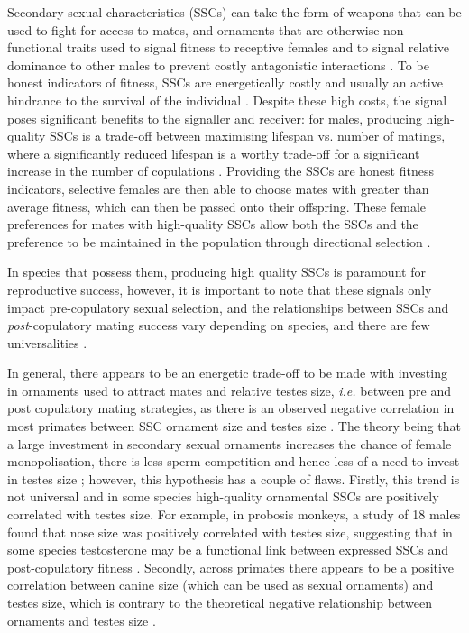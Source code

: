 Secondary sexual characteristics (SSCs)  can take the form of weapons that can be used to fight for access to mates, and ornaments that are otherwise non-functional traits used to signal fitness to receptive females and to signal relative dominance to other males to prevent costly antagonistic interactions \citep{Kappeler.2004}. To be honest indicators of fitness, SSCs are energetically costly and usually an active hindrance to the survival of the individual \citep{Zahavi.1975}. Despite these high costs, the signal poses significant benefits to the signaller and receiver: for males, producing high-quality SSCs is a trade-off between maximising lifespan vs. number of matings, where a significantly reduced lifespan is a worthy trade-off for a significant increase in the number of copulations \citep{Petersen.2020b6j}. Providing the SSCs are honest fitness indicators, selective females are then able to choose mates with greater than average fitness, which can then be passed onto their offspring. These female preferences for mates with high-quality SSCs allow both the SSCs and the preference to be maintained in the population through directional selection \citep{Gomulkiewicz.1991}. 

In species that possess them, producing high quality SSCs is paramount for reproductive success, however, it is important to note that these signals only impact pre-copulatory sexual selection, and the relationships between SSCs and \textit{post}-copulatory mating success vary depending on species, and there are few universalities \citep{Setchell.2003}.  

In general, there appears to be an energetic trade-off to be made with investing in ornaments used to attract mates and relative testes size, \textit{i.e.} between pre and post copulatory mating strategies, as there is an observed negative correlation in most primates between SSC ornament size and testes size \citep{Lüpold.2019}. The theory being that a large investment in secondary sexual ornaments increases the chance of female monopolisation, there is less sperm competition and hence less of a need to invest in testes size \citep{Simmons.2017}; however, this hypothesis has a couple of flaws. Firstly, this trend is not universal and in some species high-quality ornamental SSCs are positively correlated with testes size. For example, in probosis monkeys, a study of 18 males found that nose size was positively correlated with testes size, suggesting that in some species testosterone may be a functional link between expressed SSCs and post-copulatory fitness \citep{Matsuda.2020g6t}.  Secondly, across primates there appears to be a positive correlation between canine size (which can be used as sexual ornaments) and testes size, which is contrary to the theoretical negative relationship between ornaments and testes size \citep{Lüpold.2019}. 

